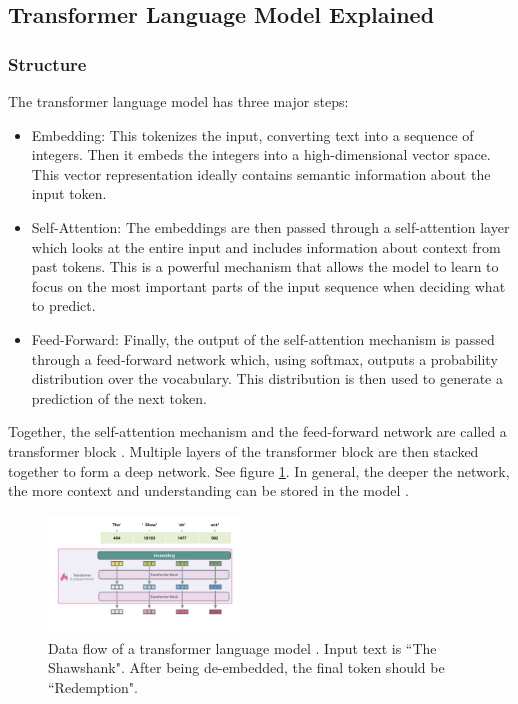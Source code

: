 \documentclass[conference]{IEEEtran}
\begin{document}
\subsection{Transformer Language Model Explained}
\subsubsection{Structure}
The transformer language model has three major steps:
\begin{itemize}
    \item Embedding: This tokenizes the input, converting text into a sequence of integers. Then it embeds the integers into a high-dimensional vector space. This vector representation ideally contains semantic information about the input token.
    \item Self-Attention: The embeddings are then passed through a self-attention layer which looks at the entire input and includes information about context from past tokens. This is a powerful mechanism that allows the model to learn to focus on the most important parts of the input sequence when deciding what to predict.
    \item Feed-Forward: Finally, the output of the self-attention mechanism is passed through a feed-forward network which, using softmax, outputs a probability distribution over the vocabulary. This distribution is then used to generate a prediction of the next token.
\end{itemize}
Together, the self-attention mechanism and the feed-forward network are called a transformer block \cite{yt}. Multiple layers of the transformer block are then stacked together to form a deep network. See figure \ref{fig:transformer}. In general, the deeper the network, the more context and understanding can be stored in the model \cite{yt}.

\begin{figure}[h]
    \centering
    \includegraphics[width=0.45\textwidth]{transformer.png}
    \caption{Data flow of a transformer language model \cite{yt}. Input text is ``The Shawshank". After being de-embedded, the final token should be ``Redemption".}
    \label{fig:transformer}
\end{figure}
\end{document}
